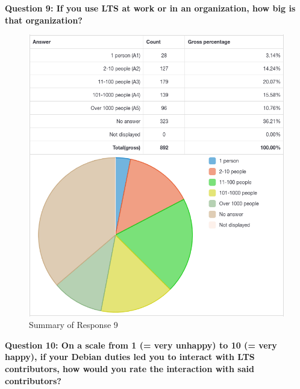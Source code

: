 \documentclass{article}
\begin{document}
\newpage

\Large{\textbf{Question 9: If you use LTS at work or in an organization, how big is that organization?}}

\vspace{3mm}
\begin{figure}[h!]
\centering
\includegraphics[width=16.5cm]{assets/9-complete-responses.png}
\caption{Summary of Response 9}
\end{figure}

\newpage

\large{\textbf{Question 10: On a scale from 1 (= very unhappy) to 10 (= very happy), if your Debian duties
led you to interact with LTS contributors, how would you rate the interaction with said contributors?}}
\end{document}

